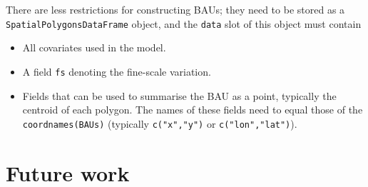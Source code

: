 \documentclass{article}\usepackage[]{graphicx}\usepackage[]{color}
\renewcommand{\tt} {\texttt}
\begin{document}
There are less restrictions for constructing BAUs; they need to be stored as a \tt{SpatialPolygonsDataFrame} object, and the \tt{data} slot of this object must contain
\begin{itemize}
\item All covariates used in the model.
\item A field \tt{fs} denoting the fine-scale variation.
\item Fields that can be used to summarise the BAU as a point, typically the centroid of each polygon. The names of these fields need to equal those of the \tt{coordnames(BAUs)} (typically \tt{c("x","y")} or \tt{c("lon","lat")}).
\end{itemize}

\section{Future work} \label{sec:future}
\end{document}

